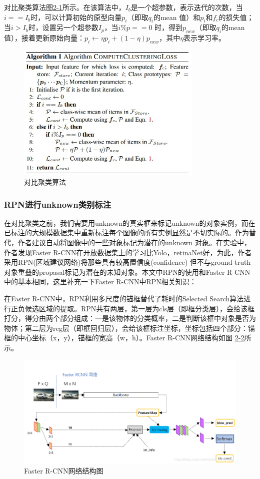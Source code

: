 对比聚类算法图\href{fig:2-1}{2-1}所示。在该算法中，$I_b$是一个超参数，表示迭代的次数，当$i == I_b$时，可以计算初始的原型向量$p_i$（即取$q_i$的mean 值）和$p_i$和$f_c$的损失值；当$i > I_b$时，设置另一个超参数$I_p$，当$i \% p == 0$ 时，得到$p_{new}$（即取$q_i$的mean值），接着更新原始向量：$p_i \leftarrow \eta p_i + (1-\eta)p_{new}$，其中$\eta$表示学习率。
\begin{figure}
  \centering
  \includegraphics[width=3.5in]{figure/example/openset4.jpg}
  \caption{对比聚类算法}
  \label{fig:2-1}
\end{figure}

\subsubsection{RPN进行unknown类别标注}
在对比聚类之前，我们需要用unknown的真实框来标记unknown的对象实例，而在已标注的大规模数据集中重新标注每个图像的所有实例显然是不切实际的。作为替代，作者建议自动将图像中的一些对象标记为潜在的unknown 对象。在实验中，作者发现Faster R-CNN在开放数据集上的学习比Yolo，retinaNet好，为此，作者采用RPN(区域建议网络)将那些具有较高置信度(confidence) 但不与ground-truth对象重叠的propasal标记为潜在的未知对象。本文中RPN的使用和Faster R-CNN中的基本相同，这里补充一下Faster R-CNN中RPN相关知识：

在Faster R-CNN中，RPN利用多尺度的锚框替代了耗时的Selected Search算法进行正负候选区域的提取。RPN共有两层，第一层为cls层（即框分类层），会给该框打分，得分由两个部分组成：一是该物体的分类概率，二是判断该框中对象是否为物体；第二层为reg层（即框回归层），会给该框标注坐标，坐标包括四个部分：锚框的中心坐标（x，y），锚框的宽高（w，h）。Faster R-CNN网络结构如图
\href{fig:2-2}{2-2}所示。

\begin{figure}
  \centering
  \includegraphics[width=4.5in]{figure/example/faster_RCNN.png}
  \caption{Faster R-CNN网络结构图}
  \label{fig:2-2}
\end{figure}


